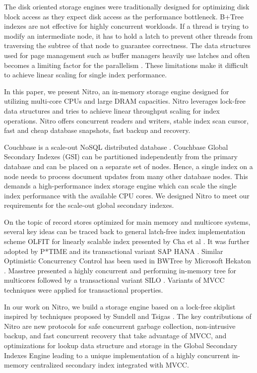 \documentclass{vldb}
\begin{document}
The disk oriented storage engines were traditionally designed for optimizing disk block access as they expect disk access as the performance bottleneck. B+Tree \cite{btree} indexes are not effective for highly concurrent workloads. If a thread is trying to modify an intermediate node, it has to hold a latch to prevent other threads from traversing the subtree of that node to guarantee correctness. The data structures used for page management such as buffer managers heavily use latches and often becomes a limiting factor for the parallelism \cite{stavris:oltp-glass}. These limitations make it difficult to achieve linear scaling for single index performance.

In this paper, we present Nitro, an in-memory storage engine designed for utilizing multi-core CPUs and large DRAM capacities. Nitro leverages lock-free data structures and tries to achieve linear throughput scaling for index operations. Nitro offers concurrent readers and writers, stable index scan cursor, fast and cheap database snapshots, fast backup and recovery.

Couchbase is a scale-out NoSQL distributed database \cite{couchbase}. Couchbase Global Secondary Indexes (GSI) can be partitioned independently from the primary database and can be placed on a separate set of nodes. Hence, a single index on a node needs to process document updates from many other database nodes. This demands a high-performance index storage engine which can scale the single index performance with the available CPU cores. We designed Nitro to meet our requirements for the scale-out global secondary indexes. 

On the topic of record stores optimized for main memory and multicore systems, several key ideas can be traced back to general latch-free index implementation scheme OLFIT for linearly scalable index presented by Cha et al \cite{olfit}. It was further adopted by P*TIME \cite{ptime} and its transactional variant SAP HANA \cite{hana}. Similar Optimistic Concurrency Control has been used in BWTree \cite{bwtree} by Microsoft Hekaton \cite{hekaton}. Masstree \cite{masstree} presented a highly concurrent and performing in-memory tree for multicores followed by a transactional variant SILO \cite{silo}. Variants of MVCC techniques were applied for transactional properties. 

In our work on Nitro, we build a storage engine based on a lock-free skiplist inspired by techniques proposed by Sundell and Tsigas \cite{lockfree-skiplist}. The key contributions of Nitro are new protocols for safe concurrent garbage collection, non-intrusive backup, and fast concurrent recovery that take advantage of MVCC, and optimizations for lookup data structure and storage in the Global Secondary Indexes Engine leading to a unique implementation of a highly concurrent in-memory centralized secondary index integrated with MVCC.
\end{document}

